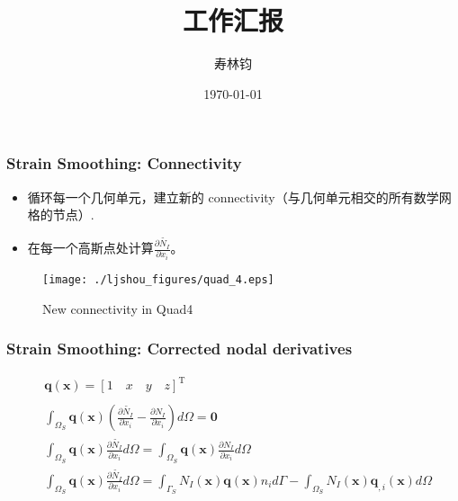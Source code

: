 \documentclass[mathserif]{beamer}
\begin{document}
\begin{CJK}{UTF8}{gkai}
	
\title{工作汇报}
\author{寿林钧} 
\date{\today} 

	\begin{frame}
		\titlepage
	\end{frame}



\begin{frame}
	\frametitle{Strain Smoothing: Connectivity}	
	\begin{itemize}
	\item 循环每一个几何单元，建立新的 connectivity（与几何单元相交的所有数学网格的节点）.
	\item 在每一个高斯点处计算$\frac{\partial \tilde{N_I}}{\partial x_i}$。
\end{itemize}		

	\begin{figure}
		\centering
		\texttt{[image: ./ljshou\_figures/quad\_4.eps]}
		\caption{New connectivity in Quad4}
	\end{figure}
\end{frame}

\begin{frame}
	\frametitle{Strain Smoothing: Corrected nodal derivatives}
	\begin{align*}
		&\mathbf{q(x)}=[1 \quad x \quad y \quad z]^{\text{T}} \\
		\\
		&\int_{\Omega_S}\mathbf{q(x)}\left(\frac{\partial \tilde{N_I}}{\partial x_i} - \frac{\partial N_I}{\partial x_i}\right)d\Omega = \mathbf{0} \\
		&\int_{\Omega_S}\mathbf{q(x)}\frac{\partial \tilde{N_I}}{\partial x_i}d\Omega = 
		\int_{\Omega_S}\mathbf{q(x)}\frac{\partial {N_I}}{\partial x_i}d\Omega \\
		&\int_{\Omega_S}\mathbf{q(x)}\frac{\partial \tilde{N_I}}{\partial x_i}d\Omega = 
		\int_{\Gamma_S}N_I(\mathbf{x})\mathbf{q(x)}n_i d\Gamma - 
		\int_{\Omega_S}N_I(\mathbf{x})\mathbf{q}_{,i}(\mathbf{x})d\Omega
	\end{align*}
\end{frame}
	

\end{CJK}
\end{document}

